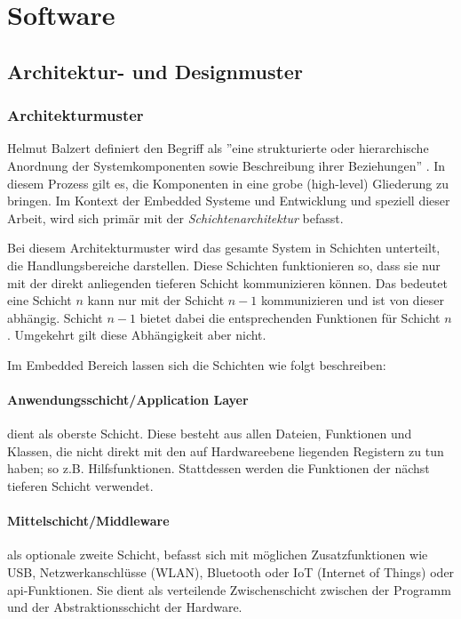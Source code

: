 \section{Software}

\label{sec:architecture_design_pattern}
\subsection{Architektur- und Designmuster}

\subsubsection{Architekturmuster}
Helmut Balzert definiert den Begriff als ''eine strukturierte oder hierarchische Anordnung der Systemkomponenten sowie Beschreibung ihrer Beziehungen'' \cite{balzert2011softwaretechnik2}.
In diesem Prozess gilt es, die Komponenten in eine grobe (high-level) Gliederung zu bringen.
Im Kontext der Embedded Systeme und Entwicklung und speziell dieser Arbeit, wird sich primär mit der \emph{Schichtenarchitektur} befasst.

Bei diesem Architekturmuster wird das gesamte System in Schichten unterteilt, die  Handlungsbereiche darstellen.
Diese Schichten funktionieren so, dass sie nur mit der direkt anliegenden tieferen Schicht kommunizieren können.
Das bedeutet eine Schicht $n$ kann nur mit der Schicht $n-1$ kommunizieren und ist von dieser abhängig.
Schicht $n-1$ bietet dabei die entsprechenden Funktionen für Schicht $n$.
Umgekehrt gilt diese Abhängigkeit aber nicht.

Im Embedded Bereich lassen sich die Schichten wie folgt beschreiben:

\paragraph{Anwendungsschicht/Application Layer}
dient als oberste Schicht.
Diese besteht aus allen Dateien, Funktionen und Klassen, die nicht direkt mit den auf Hardwareebene liegenden Registern zu tun haben; so z.B. Hilfsfunktionen.
Stattdessen werden die Funktionen der nächst tieferen Schicht verwendet.

\paragraph{Mittelschicht/Middleware}
als optionale zweite Schicht, befasst sich mit möglichen Zusatzfunktionen wie USB, Netzwerkanschlüsse (WLAN), Bluetooth oder IoT (Internet of Things) oder \gls{api}-Funktionen.
Sie dient als verteilende Zwischenschicht zwischen der Programm und der Abstraktionsschicht der Hardware.

